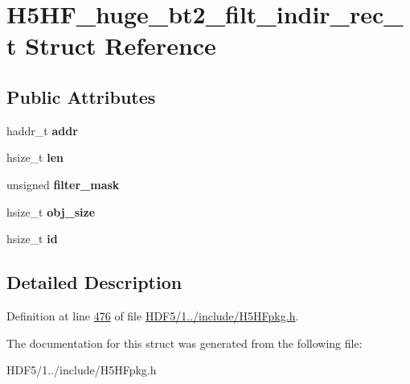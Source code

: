 \hypertarget{struct_h5_h_f__huge__bt2__filt__indir__rec__t}{}\section{H5\+H\+F\+\_\+huge\+\_\+bt2\+\_\+filt\+\_\+indir\+\_\+rec\+\_\+t Struct Reference}
\label{struct_h5_h_f__huge__bt2__filt__indir__rec__t}
\subsection*{Public Attributes}
\begin{DoxyCompactItemize}
\item 
\mbox{\label{struct_h5_h_f__huge__bt2__filt__indir__rec__t_adba180a7a652493fe90106987a5c08fa}} 
haddr\+\_\+t {\bfseries addr}
\item 
\mbox{\label{struct_h5_h_f__huge__bt2__filt__indir__rec__t_a841afb05ecc3d62209f277a8d3ad9791}} 
hsize\+\_\+t {\bfseries len}
\item 
\mbox{\label{struct_h5_h_f__huge__bt2__filt__indir__rec__t_af2d2e7af8e14aa4e5980932f0dbdd822}} 
unsigned {\bfseries filter\+\_\+mask}
\item 
\mbox{\label{struct_h5_h_f__huge__bt2__filt__indir__rec__t_a7547c602ad0c1c6654512e4415b90563}} 
hsize\+\_\+t {\bfseries obj\+\_\+size}
\item 
\mbox{\label{struct_h5_h_f__huge__bt2__filt__indir__rec__t_afe94fabc7dd578bc259f4a62b4d77066}} 
hsize\+\_\+t {\bfseries id}
\end{DoxyCompactItemize}


\subsection{Detailed Description}


Definition at line \hyperlink{_h_d_f5_21_810_81_2include_2_h5_h_fpkg_8h_source_l00476}{476} of file \hyperlink{_h_d_f5_21_810_81_2include_2_h5_h_fpkg_8h_source}{H\+D\+F5/1../include/\+H5\+H\+Fpkg.\+h}.



The documentation for this struct was generated from the following file\+:\begin{DoxyCompactItemize}
\item 
H\+D\+F5/1../include/\+H5\+H\+Fpkg.\+h\end{DoxyCompactItemize}
